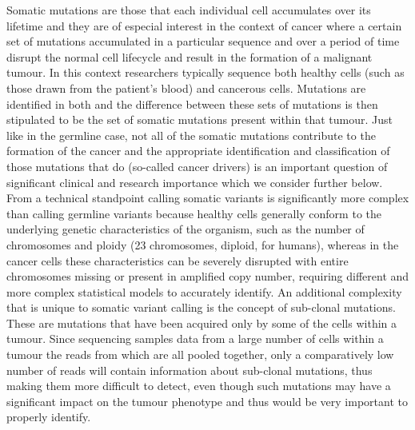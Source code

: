 Somatic mutations are those that each individual cell accumulates over its lifetime and they are of especial interest in the context of cancer where a certain set of mutations accumulated in a particular sequence and over a period of time disrupt the normal cell lifecycle and result in the formation of a malignant tumour. In this context researchers typically sequence both healthy cells (such as those drawn from the patient's blood) and cancerous cells. Mutations are identified in both and the difference between these sets of mutations is then stipulated to be the set of somatic mutations present within that tumour. Just like in the germline case, not all of the somatic mutations contribute to the formation of the cancer and the appropriate identification and classification of those mutations that do (so-called cancer drivers) is an important question of significant clinical and research importance which we consider further below. From a technical standpoint calling somatic variants is significantly more complex than calling germline variants because healthy cells generally conform to the underlying genetic characteristics of the organism, such as the number of chromosomes and ploidy (23 chromosomes, diploid, for humans), whereas in the cancer cells these characteristics can be severely disrupted with entire chromosomes missing or present in amplified copy number, requiring different and more complex statistical models to accurately identify. An additional complexity that is unique to somatic variant calling is the concept of sub-clonal mutations. These are mutations that have been acquired only by some of the cells within a tumour. Since sequencing samples data from a large number of cells within a tumour the reads from which are all pooled together, only a comparatively low number of reads will contain information about sub-clonal mutations, thus making them more difficult to detect, even though such mutations may have a significant impact on the tumour phenotype and thus would be very important to properly identify.

